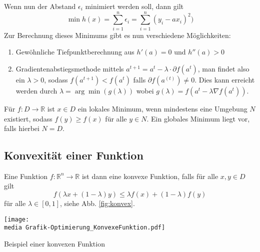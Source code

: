 \begin{Thm}
Wenn nun der Abstand $\epsilon_i$ minimiert werden soll, dann gilt
\begin{equation*}
\min h(x)={\sum_{i=1}^n\epsilon_i} = {\sum_{i=1}^n(y_i-ax_i)^2)}
\end{equation*}
 Zur Berechnung dieses Minimums gibt es nun verschiedene Möglichkeiten:
\begin{enumerate}
\item Gewöhnliche Tiefpunktberechnung aus
$h'(a)=0$ und $h''(a)>0$
\item Gradientenabstiegsmethode mittels
$a^{t+1}  =a^{t} - \lambda \cdot \partial f(a^{t})$,
man findet also ein $\lambda > 0$, sodass
$f(a^{t+1}) < f(a^{t})$ falls $ \partial f(a^{(t)}) \neq 0$. Dies kann erreicht werden durch $\lambda=\arg\min(g(\lambda))$ wobei
$g(\lambda)=f(a^t-\lambda\nabla f(a^t))$.
\end{enumerate}

\end{Thm}

\begin{Def}
Für $f: D\rightarrow \mathbb{R}$ ist $x\in D$ ein lokales Minimum, wenn mindestens eine Umgebung $N$ existiert, sodass $f(y)\geq f(x)$ für alle $y\in N$.
Ein globales Minimum liegt vor, falls hierbei $N=D$.
\end{Def}

\subsection{Konvexität einer Funktion}

\begin{Def}
Eine Funktion $f: \mathbb{R}^n\rightarrow\mathbb{R}$ ist dann eine konvexe Funktion, falls für alle $x, y\in D$ gilt
\begin{equation*}
  f(\lambda x+ (1 - \lambda)y) \leq \lambda f(x)+(1-\lambda)f(y)
\end{equation*}
für alle $\lambda \in [0, 1]$, siehe Abb. \ref{fig:konvex}.

\begin{dsafigure}
\begin{center}
\texttt{[image: \\media Grafik-Optimierung\_KonvexeFunktion.pdf]}
\caption{Beispiel einer konvexen Funktion}
\label{fig:konvex}
\end{center}
\end{dsafigure}



\end{Def}

